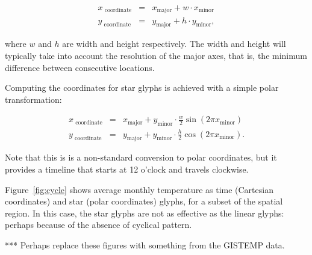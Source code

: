 \documentclass[oneside]{article}
\newcommand\amin{\text{minor}}
\newcommand\amaj{\text{major}}
\begin{document}
\begin{equation}
  \begin{array}{lll}
  x_\text{ coordinate}&=& x_{\amaj} + w \cdot x_{\amin}\\
  y_\text{ coordinate}&=& y_{\amaj} + h \cdot y_{\amin}, 
  \end{array}
  \label{coords.eqn}
\end{equation}

\noindent where $w$ and $h$ are width and height respectively. The width and height will typically take into account the resolution of the major axes, that is, the minimum difference between consecutive locations.

Computing the coordinates for star glyphs is achieved with a simple polar transformation: 

\begin{equation}
  \begin{array}{lll}
  x_\text{ coordinate}&=& x_{\amaj} + y_{\amin} \cdot \frac{w}{2} \sin(2 \pi x_{\amin}) \\
  y_\text{ coordinate}&=& y_{\amaj} + y_{\amin} \cdot \frac{h}{2} \cos(2 \pi x_{\amin}).
  \end{array}
  \label{coords.polar.eqn}
\end{equation}

\noindent Note that this is is a non-standard conversion to polar coordinates, but it provides a timeline that starts at 12 o'clock and travels clockwise.

Figure~\ref{fig:cycle} shows average monthly temperature as time (Cartesian coordinates) and star (polar coordinates) glyphs, for a subset of the spatial region. In this case, the star glyphs are not as effective as the linear glyphs: perhaps because of the absence of cyclical pattern.

*** Perhaps replace these figures with something from the GISTEMP data.
\end{document}

